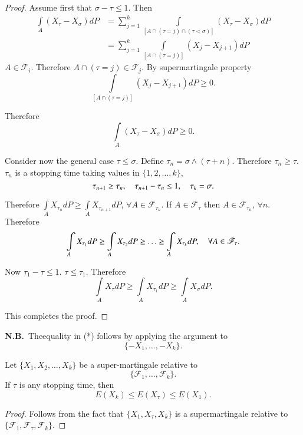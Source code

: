 \begin{proof}
Assume\pageoriginale 
first that $\sigma-\tau\leq 1$. Then
\begin{align*}
\int\limits_{A}(X_{\tau}-X_{\sigma})dP &=
\sum\limits^{k}_{j=1}\int\limits_{[A\cap (\tau=j)\cap
    (\tau<\sigma)]}(X_{\tau}-X_{\sigma})dP\\
&= \sum\limits^{k}_{j=1}\int\limits_{[A\cap (\tau=j)]}(X_{j}-X_{j+1})dP
\end{align*}
$A\in \mathscr{F}_{i}$. Therefore $A\cap (\tau=j)\in
\mathscr{F}_{j}$. By supermartingale property
$$
\int\limits_{[A\cap (\tau=j)]}(X_{j}-X_{j+1})dP\geq 0.
$$

Therefore
$$
\int\limits_{A}(X_{\tau}-X_{\sigma})dP\geq 0.
$$

Consider now the general case $\tau\leq \sigma$. Define
$\tau_{n}=\sigma\wedge (\tau +n)$. Therefore $\tau_{n}\geq
\tau$. $\tau_{n}$ is a stopping time taking values in
$\{1,2,\ldots,k\}$, 
$$
\tau_{n+1}\geq\tau_{n},\quad \tau_{n+1}-\tau_{n}\leq 1,\quad
\tau_{k}=\sigma.
$$

Therefore $\int\limits_{A}X_{\tau_{n}}dP\geq
\int\limits_{A}X_{\tau_{n+1}}dP$, $\forall A\in
\mathscr{F}_{\tau_{n}}$. If $A\in \mathscr{F}_{\tau}$ then $A\in
\mathscr{F}_{\tau_{n}}$, $\forall n$. Therefore
$$
\int\limits_{A}X_{\tau_{1}}dP\geq \int\limits_{A}X_{\tau_{2}}dP\geq
\ldots \geq \int\limits_{A}X_{\tau_{k}}dP,\quad \forall A\in
\mathscr{F}_{\tau}. 
$$

Now $\tau_{1}-\tau\leq 1$. $\tau\leq \tau_{1}$. Therefore
$$
\int\limits_{A}X_{\tau}dP\geq \int\limits_{A}X_{\tau_{1}}dP\geq
\int\limits_{A}X_{\sigma}dP. 
$$

This completes the proof.
\end{proof}

\noindent
{\bf N.B.}~The\pageoriginale equality in (*) follows by applying the
argument to 
$$
\{-X_{1},\ldots,-X_{k}\}.
$$

\begin{corollary}
Let $\{X_{1},X_{2},\ldots,X_{k}\}$ be a super-martingale relative to
$$
\{\mathscr{F}_{1},\ldots,\mathscr{F}_{k}\}.
$$ 
If $\tau$ is any
stopping time, then
$$
E(X_{k})\leq E(X_{\tau})\leq E(X_{1}).
$$
\end{corollary}

\begin{proof}
Follows from the fact that $\{X_{1},X_{\tau},X_{k}\}$ is a
supermartingale relative to
$\{\mathscr{F}_{1},\mathscr{F}_{\tau},\mathscr{F}_{k}\}$. 
\end{proof}

